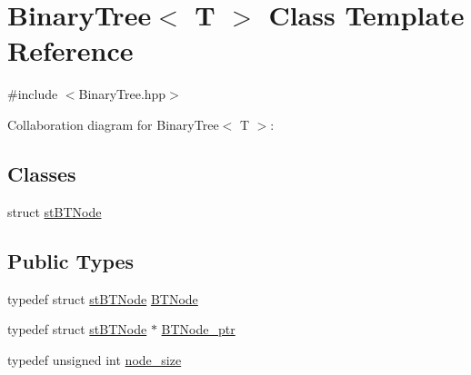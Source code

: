 \hypertarget{class_binary_tree}{}\section{Binary\+Tree$<$ T $>$ Class Template Reference}
\label{class_binary_tree}


{\ttfamily \#include $<$Binary\+Tree.\+hpp$>$}



Collaboration diagram for Binary\+Tree$<$ T $>$\+:
\subsection*{Classes}
\begin{DoxyCompactItemize}
\item 
struct \hyperlink{struct_binary_tree_1_1st_b_t_node}{st\+B\+T\+Node}
\end{DoxyCompactItemize}
\subsection*{Public Types}
\begin{DoxyCompactItemize}
\item 
typedef struct \hyperlink{struct_binary_tree_1_1st_b_t_node}{st\+B\+T\+Node} \hyperlink{class_binary_tree_a626c02fa72521fa5977d10d8785552f7}{B\+T\+Node}
\item 
typedef struct \hyperlink{struct_binary_tree_1_1st_b_t_node}{st\+B\+T\+Node} $\ast$ \hyperlink{class_binary_tree_a35ef67d8ee2843144c5c309c5a6ecd5b}{B\+T\+Node\+\_\+ptr}
\item 
typedef unsigned int \hyperlink{class_binary_tree_a6c9d1d57bf13ca658fe926a0c7255ecf}{node\+\_\+size}
\end{DoxyCompactItemize}
